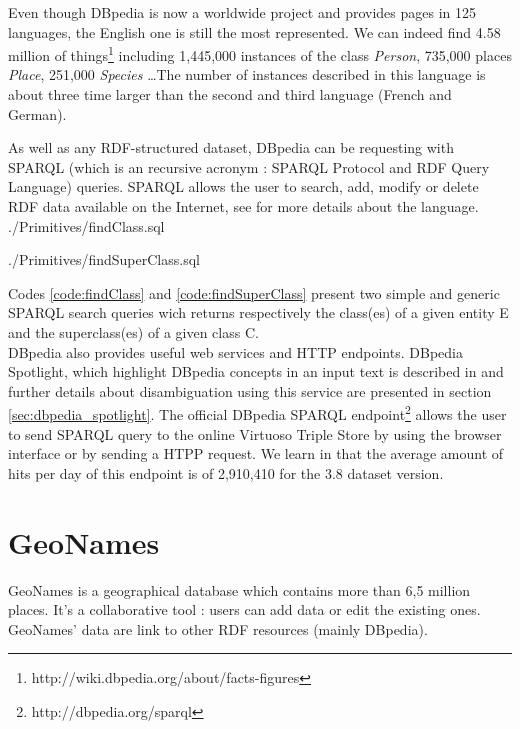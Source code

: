 Even though DBpedia is now a worldwide project and provides pages in 125 languages, the English one is still the most represented. We can indeed find 4.58 million of things\footnote{http://wiki.dbpedia.org/about/facts-figures} including 1,445,000 instances of the class \textit{Person}, 735,000 places \textit{Place}, 251,000 \textit{Species} \dots The number of instances described in this language is about three time larger than the second and third language (French and German). 

As well as any RDF-structured dataset, DBpedia can be requesting with SPARQL (which is an recursive acronym : SPARQL Protocol and RDF Query Language) queries. SPARQL allows the user to search, add, modify or delete RDF data available on the Internet, see \cite{prud2008sparql} for more details about the language. \\


	{./Primitives/findClass.sql}


	{./Primitives/findSuperClass.sql}

Codes \ref{code:findClass} and \ref{code:findSuperClass} present two simple and generic SPARQL search queries wich returns respectively the class(es) of a given entity E and the superclass(es) of a given class C.\\

DBpedia also provides useful web services and HTTP endpoints. DBpedia Spotlight, which highlight DBpedia concepts in an input text is described in \cite{mendes2011dbpedia} and further details about disambiguation using this service are presented in section \ref{sec:dbpedia_spotlight}. The official DBpedia SPARQL endpoint\footnote{http://dbpedia.org/sparql} allows the user to send SPARQL query to the online Virtuoso Triple Store by using the browser interface or by sending a HTPP request. We learn in \cite{lehmann2014dbpedia} that the average amount of hits per day of this endpoint is of 2,910,410 for the 3.8 dataset version. 


\section{GeoNames}

GeoNames is a geographical database which contains more than 6,5 million places. It's a collaborative tool : users can add data or edit the existing ones. GeoNames' data are link to other RDF resources (mainly DBpedia). \\

